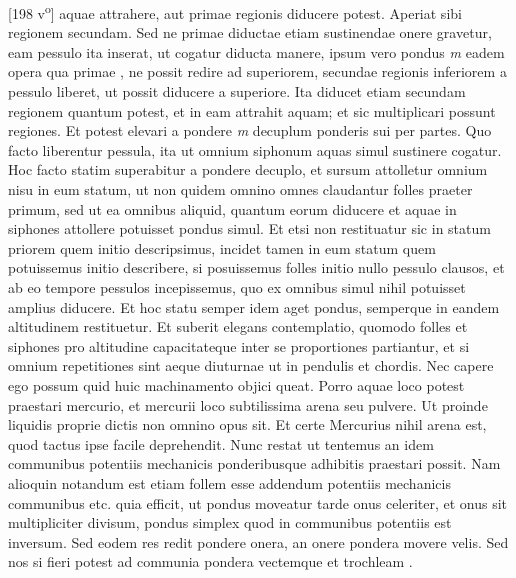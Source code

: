 [198 v\textsuperscript{o}] aquae attrahere, aut primae regionis diducere potest. Aperiat sibi regionem secundam. Sed ne primae diductae etiam sustinendae onere gravetur, eam pessulo ita inserat, ut cogatur diducta manere, ipsum vero pondus \textit{m} eadem opera qua primae , ne possit redire ad superiorem, secundae regionis inferiorem a pessulo liberet, ut possit diducere a superiore. Ita diducet etiam secundam regionem quantum potest, et in eam attrahit aquam; et sic multiplicari possunt regiones. Et potest elevari a pondere \textit{m} decuplum ponderis sui per partes. Quo facto liberentur pessula, ita ut omnium siphonum\protect{} aquas simul sustinere cogatur. Hoc facto statim superabitur a pondere decuplo, et sursum attolletur omnium nisu in eum statum, ut non quidem omnino omnes claudantur folles praeter primum, sed ut ea omnibus aliquid, quantum eorum diducere et aquae in siphones\protect{} attollere potuisset pondus simul. Et etsi non restituatur sic in statum priorem quem initio descripsimus, incidet tamen in eum statum quem potuissemus initio describere, si posuissemus folles initio nullo pessulo clausos, et ab eo tempore pessulos incepissemus, quo ex omnibus simul nihil potuisset amplius diducere. Et hoc statu semper idem aget pondus, semperque in eandem altitudinem restituetur. Et suberit elegans contemplatio, quomodo folles et siphones\protect{} pro altitudine capacitateque inter se proportiones partiantur, et si omnium repetitiones sint aeque diuturnae ut in pendulis\protect{} et chordis. Nec capere ego possum quid huic machinamento objici queat. Porro aquae loco potest praestari mercurio\protect{}, et mercurii\protect{} loco subtilissima arena seu pulvere. Ut proinde liquidis proprie dictis non omnino opus sit. Et certe Mercurius\protect{} nihil  arena est, quod tactus ipse facile deprehendit. \pend \pstart Nunc restat ut tentemus an idem communibus potentiis mechanicis ponderibusque adhibitis praestari possit. Nam alioquin notandum est etiam follem esse addendum potentiis mechanicis communibus etc. quia efficit, ut pondus moveatur tarde onus celeriter, et onus sit multipliciter divisum, pondus simplex quod in communibus potentiis est inversum. Sed eodem res redit pondere onera, an onere pondera movere velis. Sed nos si fieri potest ad communia pondera vectemque\protect{} et trochleam\protect{} . \pend